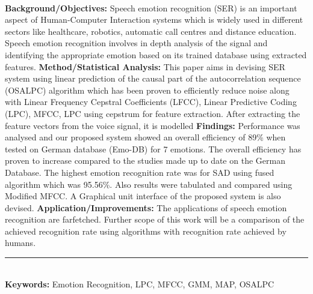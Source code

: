 \documentclass[10pt,a4paper,twoside]{article}
\begin{document}
\begin{shaded}
{}\\
\fontsize{9pt}{13pt}\selectfont
\textbf{Background/Objectives:} Speech emotion recognition (SER) is an important aspect of Human-Computer Interaction systems which is widely used in different sectors like healthcare, robotics, automatic call centres and distance education.
Speech emotion recognition involves in depth analysis of the signal and identifying the appropriate emotion based on
its trained database using extracted features. \textbf{Method/Statistical Analysis:} This paper aims in devising SER system
using linear prediction of the causal part of the autocorrelation sequence (OSALPC) algorithm which has been proven
to efficiently reduce noise along with Linear Frequency Cepstral Coefficients (LFCC), Linear Predictive Coding (LPC),
MFCC, LPC using cepstrum for feature extraction. After extracting the feature vectors from the voice signal, it is modelled \textbf{Findings:}
Performance was analysed and our proposed system showed an overall efficiency of 89\% when tested on German database
(Emo-DB) for 7 emotions. The overall efficiency has proven to increase compared to the studies made up to date on the
German Database. The highest emotion recognition rate was for SAD using fused algorithm which was 95.56\%. Also results
were tabulated and compared using Modified MFCC. A Graphical unit interface of the proposed system is also devised.
\textbf{Application/Improvements:} The applications of speech emotion recognition are farfetched. Further scope of this work
will be a comparison of the achieved recognition rate using algorithms with recognition rate achieved by humans.
\end{shaded}
\vspace{-0,7cm}
{\color{tieude}\rule{17cm}{0,1pt}}\\
{\color{tieude}\textbf{Keywords:}} Emotion Recognition, LPC, MFCC, GMM, MAP, OSALPC
\end{document}
